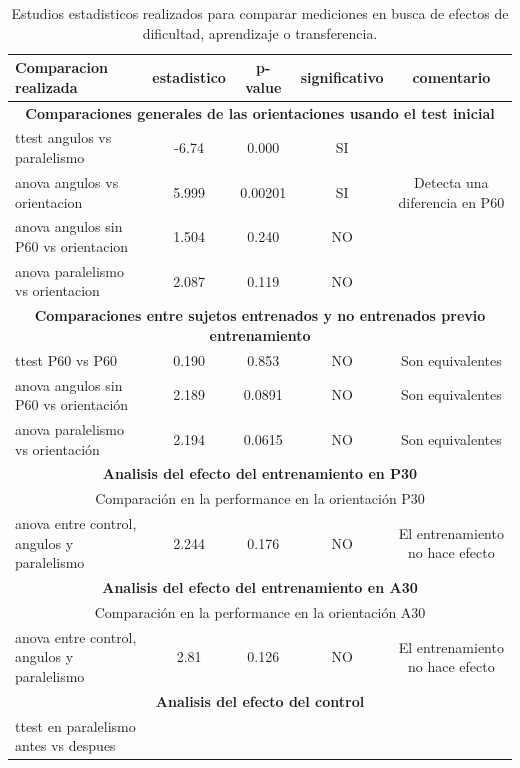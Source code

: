 \documentclass{article}
\begin{document}
\begin{table}
\begin{center}

\caption{Estudios estadisticos realizados para comparar mediciones en busca de efectos de dificultad, aprendizaje o transferencia.}
\label{tabla:significativos}

\vspace{0.3in}

\begin{tabular}{lcccc}
\textbf{Comparacion realizada} & estadistico & p-value & significativo & comentario\\
\midrule
\midrule
\multicolumn{5}{c}{ \textbf{Comparaciones generales de las orientaciones usando el test inicial}} \\
\midrule
ttest angulos vs paralelismo & -6.74 & 0.000 & SI \\
anova angulos vs orientacion & 5.999 & 0.00201 & SI & Detecta una diferencia en P60 \\
anova angulos sin P60 vs orientacion  & 1.504 &  0.240 & NO \\
anova paralelismo vs orientacion & 2.087 & 0.119 & NO\\
\midrule
\multicolumn{5}{c}{ \textbf{Comparaciones entre sujetos entrenados y no entrenados previo entrenamiento}} \\
\midrule
ttest P60 vs P60 & 0.190 & 0.853 & NO & Son equivalentes\\
anova angulos sin P60 vs orientación & 2.189 & 0.0891 & NO & Son equivalentes\\
anova paralelismo vs orientación & 2.194 & 0.0615 & NO & Son equivalentes\\
\midrule
\multicolumn{5}{c}{ \textbf{Analisis del efecto del entrenamiento en P30}} \\
\midrule
\midrule
\multicolumn{5}{c}{Comparación en la performance en la orientación P30} \\
\midrule
anova entre control, angulos y paralelismo & 2.244 & 0.176 & NO & El entrenamiento no hace efecto \\

\midrule
\multicolumn{5}{c}{ \textbf{Analisis del efecto del entrenamiento en A30}} \\
\midrule
\midrule
\multicolumn{5}{c}{Comparación en la performance en la orientación A30} \\
\midrule
anova entre control, angulos y paralelismo & 2.81 & 0.126 & NO & El entrenamiento no hace efecto \\


\midrule
\multicolumn{5}{c}{ \textbf{Analisis del efecto del control}} \\
\midrule
ttest en paralelismo antes vs despues 

\bottomrule
\end{tabular}

\end{center}
\end{table}
\end{document}
